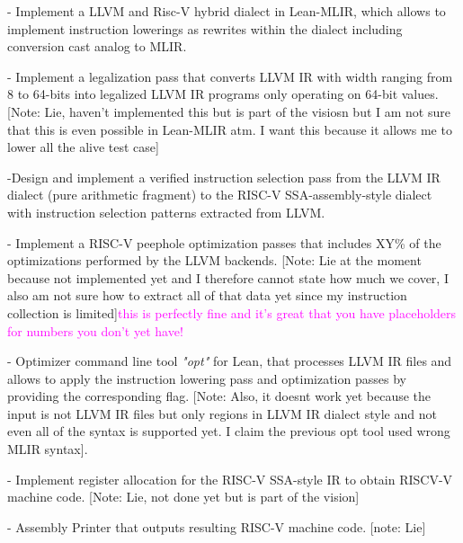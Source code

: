 - Implement a LLVM and Risc-V hybrid dialect in Lean-MLIR, which allows to implement instruction lowerings as rewrites within the dialect including conversion cast analog to MLIR.

- Implement a legalization pass that converts LLVM IR with width ranging from 8 to 64-bits into legalized LLVM IR programs only operating on 64-bit values. 
[Note: Lie, haven't implemented this but is part of the visiosn but I am not sure that this is even possible in Lean-MLIR atm. I want this because it allows me to lower all the alive test case]

-Design and implement a verified instruction selection pass from the LLVM IR dialect (pure arithmetic fragment) to the RISC-V SSA-assembly-style dialect with instruction selection patterns extracted from LLVM.

- Implement a RISC-V peephole optimization passes that includes XY\% of the optimizations performed by the LLVM backends.
[Note: Lie at the moment because not implemented yet and I therefore cannot state how much we cover, I also am not sure how to extract all of that data yet since my instruction collection is limited]\textcolor{magenta}{this is perfectly fine and it's great that you have placeholders for numbers you don't yet have!}

- Optimizer command line tool \textit{"opt"} for Lean, that processes LLVM IR files and allows to apply the instruction lowering pass and optimization passes by providing the corresponding flag.
[Note: Also, it doesnt work yet because the input is not LLVM IR files but only regions in LLVM IR dialect style and not even all of the syntax is supported yet. I claim the previous opt tool used wrong MLIR syntax].

- Implement register allocation for the RISC-V SSA-style IR to obtain RISCV-V machine code.
[Note: Lie, not done yet but is part of the vision]

- Assembly Printer that outputs resulting RISC-V machine code.
[note: Lie]
